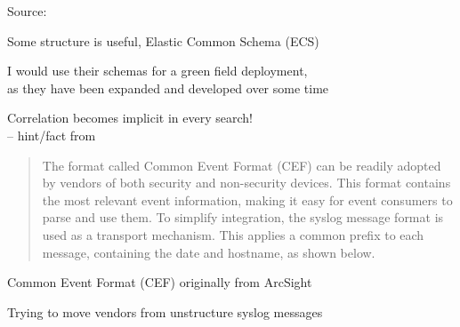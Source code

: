 \documentclass[Screen16to9,17pt]{foils}
\begin{document}

Source: 






\begin{quote}

\end{quote}

\begin{list2}

\item Some structure is useful, Elastic Common Schema (ECS)\\
\item I would use their schemas for a green field deployment,\\
  as they have been expanded and developed over some time
\item Correlation becomes implicit in every search!\\
-- hint/fact from {\small{}}
\end{list2}




\begin{quote}
  The format called Common Event Format (CEF) can be readily adopted by
  vendors of both security and non-security devices. This format contains the
  most relevant event information, making it easy for event consumers to parse
  and use them.
  To simplify integration, the syslog message format is used as a transport
  mechanism. This applies a common prefix to each message, containing the
  date and hostname, as shown below.
\end{quote}

\begin{list2}
\item Common Event Format (CEF) originally from ArcSight
\item Trying to move vendors from unstructure syslog messages
\item {}
\end{list2}

\end{document}
